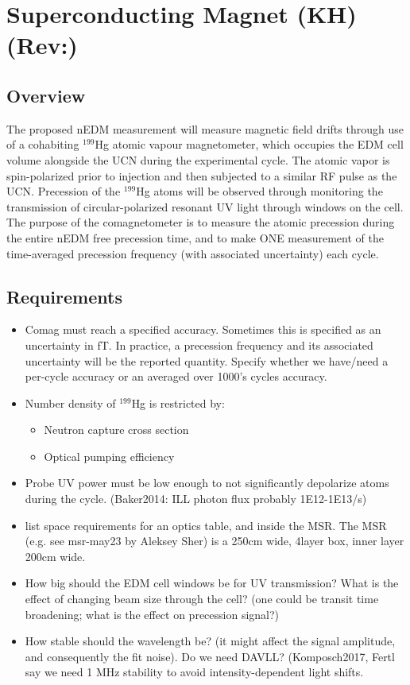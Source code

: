 \documentclass[11pt]{article}
\begin{document}
 \clearpage
\section{Superconducting Magnet {\color{red}(KH)} {\color{darkgreen}(Rev:)}}
\label{sec:AMC}



\subsection{Overview}
The proposed nEDM measurement will measure magnetic field drifts through use of a cohabiting $^{199}$Hg atomic vapour magnetometer, which occupies the EDM cell volume alongside the UCN during the experimental cycle.  The atomic vapor is spin-polarized prior to injection and then subjected to a similar RF pulse as the UCN.  Precession of the $^{199}$Hg atoms will be observed through monitoring the transmission of circular-polarized resonant UV light through windows on the cell.  The purpose of the comagnetometer is to measure the atomic precession during the entire nEDM free precession time, and to make ONE measurement of the time-averaged precession frequency (with associated uncertainty) each cycle.

\subsection{Requirements}
\begin{itemize}
\item Comag must reach a specified accuracy.  Sometimes this is specified as an uncertainty in fT.  In practice, a precession frequency and its associated uncertainty will be the reported quantity.  Specify whether we have/need a per-cycle accuracy or an averaged over 1000's cycles accuracy.
\item Number density of $^{199}$Hg is restricted by:
\begin{itemize}
\item Neutron capture cross section
\item Optical pumping efficiency
\end{itemize}
\item Probe UV power must be low enough to not significantly depolarize atoms during the cycle.  (Baker2014: ILL photon flux probably 1E12-1E13/s)
\item list space requirements for an optics table, and inside the MSR.  The MSR (e.g. see msr-may23 by Aleksey Sher) is a 250cm wide, 4layer box, inner layer 200cm wide.
\item How big should the EDM cell windows be for UV transmission?  What is the effect of changing beam size through the cell?  (one could be transit time broadening; what is the effect on precession signal?)
\item How stable should the wavelength be?  (it might affect the signal amplitude, and consequently the fit noise).  Do we need DAVLL?  (Komposch2017, Fertl say we need 1 MHz stability to avoid intensity-dependent light shifts.
\end{itemize}
\end{document}
